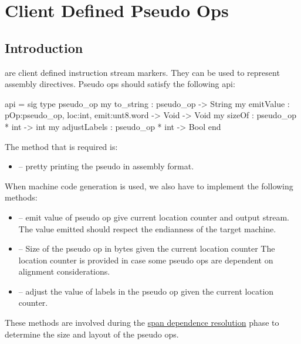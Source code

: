 \section{Client Defined Pseudo Ops}
\subsection{Introduction}
are client defined instruction stream markers.  They
can be used to represent assembly directives.
Pseudo ops should satisfy the following api:
\begin{SML}
api  = sig
  type pseudo_op
  my to_string : pseudo_op -> String
  my emitValue : {pOp:pseudo_op, loc:int, emit:unt8.word -> Void} -> Void
  my sizeOf : pseudo_op * int -> int
  my adjustLabels : pseudo_op * int -> Bool
end
\end{SML}

The method that is required is:
\begin{itemize}
 \item {} -- pretty printing the pseudo in assembly format.
\end{itemize}

When machine code generation is used, we also have to implement
the following methods:
\begin{itemize}
 \item {} --
    emit value of pseudo op give current location counter and output
    stream. The value emitted should respect the endianness of the
    target machine.
 \item {} --
    Size of the pseudo op in bytes given the current location counter
    The location counter is provided in case some pseudo ops are 
    dependent on alignment considerations.
 \item {} --
    adjust the value of labels in the pseudo op given the current
    location counter.
\end{itemize}
These methods are involved during the 
\href{span-dep.html}{span dependence resolution} phase to determine
the size and layout of the pseudo ops.
